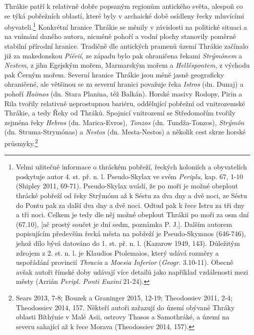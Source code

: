 Thrákie patří k relativně dobře popsaným regionům antického světa, alespoň co se týká pobřežních oblastí, které byly v archaické době osídleny řecky mluvícími obyvateli.\footnote{Velmi užitečné informace o thráckém pobřeží, řeckých koloniích a obyvatelích poskytuje autor 4. st. př. n. l. Pseudo-Skylax ve svém {\em Periplu}, kap. 67, 1-10 (Shipley 2011, 69-71). Pseudo-Skylax uvádí, že po moři je možné obeplout thrácké pobřeží od řeky Strýmónu až k Séstu za dva dny a dvě noci, ze Séstu do Pontu pak za další dva dny a dvě noci. Odtud pak k řece Istru za tři dny a tři noci. Celkem je tedy dle něj možné obeplout Thrákii po moři za osm dní (67.10), {[}ač prostý součet je dní sedm, poznámka P. J.{]}. Dalším autorem popisujícím především řecká města na pobřeží je Pseudo-Skymnos (646-746), jehož dílo bývá datováno do 1. st. př. n. l. (Kazarow 1949, 143). Důležitým zdrojem z 2. st. n. l. je Klaudios Ptolemaios, který udává rozměry a uspořádání provincií {\em Thracia} a {\em Moesia Inferior} ({\em Geogr}. 3.10-11). Obecně avšak autoři římské doby udávají více detailů jako například vzdálenosti mezi městy (Arrián {\em Peripl. Ponti Euxini} 21-24).} Konkrétní hranice Thrákie se měnily v závislosti na politické situaci a na vnímání daného autora, nicméně pohoří a vodní plochy stanovily poměrně stabilní přírodní hranice. Tradičně dle antických pramenů území Thrákie začínalo již za makedonskou {\em Píérií}, ze západu bylo pak ohraničena řekami {\em Strýmónem} a {\em Nestem}, z jihu Egejským mořem, Marmarským mořem a {\em Helléspontem}, z východu pak Černým mořem. Severní hranice Thrákie jsou méně jasně geograficky ohraničené, ale většinou se za severní hranici považuje řeka {\em Istros} (dn. Dunaj) a pohoří {\em Haimos} (dn. Stara Planina, též Balkán). Horské masivy Rodopy, Pirin a Rila tvořily relativně neprostupnou bariéru, oddělující pobřežní od vnitrozemské Thrákie, a tedy Řeky od Thráků. Spojnicí vnitrozemí se Středomořím tvořily zejména řeky {\em Hebros} (dn. Marica-Evros), {\em Tonzos} (dn. Tundža-Tonzos), {\em Strýmón} (dn. Struma-Strymónas) a {\em Nestos} (dn. Mesta-Nestos) a několik cest skrze horské průsmyky.\footnote{Sears 2013, 7-8; Bouzek a Graninger 2015, 12-19; Theodossiev 2011, 2-4; Theodossiev 2014, 157. Někteří autoři zařazují do území obývané Thráky oblasti Bíthýnie v Malé Asii, ostrovy Thasos a Samothráké, a území na severu sahající až k řece Morava (Theodossiev 2014, 157).}

